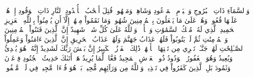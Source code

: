 وَٱلسَّمَآءِ ذَاتِ ٱلۡبُرُوجِ
وَٱلۡيَوۡمِ ٱلۡمَوۡعُودِ
وَشَاهِدٖ وَمَشۡهُودٖ
قُتِلَ أَصۡحَٰبُ ٱلۡأُخۡدُودِ
ٱلنَّارِ ذَاتِ ٱلۡوَقُودِ
إِذۡ هُمۡ عَلَيۡهَا قُعُودٞ
وَهُمۡ عَلَىٰ مَا يَفۡعَلُونَ بِٱلۡمُؤۡمِنِينَ شُهُودٞ
وَمَا نَقَمُواْ مِنۡهُمۡ إِلَّآ أَن يُؤۡمِنُواْ بِٱللَّهِ ٱلۡعَزِيزِ ٱلۡحَمِيدِ
ٱلَّذِي لَهُۥ مُلۡكُ ٱلسَّمَٰوَٰتِ وَٱلۡأَرۡضِۚ وَٱللَّهُ عَلَىٰ كُلِّ شَيۡءٖ شَهِيدٌ
إِنَّ ٱلَّذِينَ فَتَنُواْ ٱلۡمُؤۡمِنِينَ وَٱلۡمُؤۡمِنَٰتِ ثُمَّ لَمۡ يَتُوبُواْ فَلَهُمۡ عَذَابُ جَهَنَّمَ وَلَهُمۡ عَذَابُ ٱلۡحَرِيقِ
إِنَّ ٱلَّذِينَ ءَامَنُواْ وَعَمِلُواْ ٱلصَّـٰلِحَٰتِ لَهُمۡ جَنَّـٰتٞ تَجۡرِي مِن تَحۡتِهَا ٱلۡأَنۡهَٰرُۚ ذَٰلِكَ ٱلۡفَوۡزُ ٱلۡكَبِيرُ
إِنَّ بَطۡشَ رَبِّكَ لَشَدِيدٌ
إِنَّهُۥ هُوَ يُبۡدِئُ وَيُعِيدُ
وَهُوَ ٱلۡغَفُورُ ٱلۡوَدُودُ
ذُو ٱلۡعَرۡشِ ٱلۡمَجِيدُ
فَعَّالٞ لِّمَا يُرِيدُ
هَلۡ أَتَىٰكَ حَدِيثُ ٱلۡجُنُودِ
فِرۡعَوۡنَ وَثَمُودَ
بَلِ ٱلَّذِينَ كَفَرُواْ فِي تَكۡذِيبٖ
وَٱللَّهُ مِن وَرَآئِهِم مُّحِيطُۢ
بَلۡ هُوَ قُرۡءَانٞ مَّجِيدٞ
فِي لَوۡحٖ مَّحۡفُوظِۭ